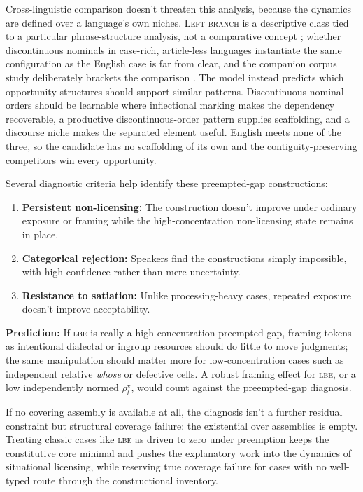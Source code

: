 \documentclass[12pt,letterpaper]{article}
\newcommand{\term}[1]{\textsc{#1}}
\newcommand{\mention}[1]{\textit{#1}}
\newcommand{\abbr}[1]{\textsc{#1}}
\begin{document}
Cross-linguistic comparison doesn't threaten this analysis, because the dynamics
are defined over a language's own niches. \term{Left branch} is a descriptive
class tied to a particular phrase-structure analysis, not a comparative concept
\autocite{haspelmath2010}; whether discontinuous nominals in case-rich,
article-less languages instantiate the same configuration as the English case is
far from clear, and the companion corpus study deliberately brackets the
comparison \autocite{reynolds2026lbe}. The model instead predicts which
opportunity structures should support similar patterns. Discontinuous nominal
orders should be learnable where inflectional marking makes the dependency
recoverable, a productive discontinuous-order pattern supplies scaffolding, and a
discourse niche makes the separated element useful. English meets none of the
three, so the candidate has no scaffolding of its own and the
contiguity-preserving competitors win every opportunity.

Several diagnostic criteria help identify these preempted-gap constructions:
\begin{enumerate}
\item \textbf{Persistent non-licensing:} The construction doesn't improve under ordinary exposure or framing while the high-concentration non-licensing state remains in place.
\item \textbf{Categorical rejection:} Speakers find the constructions simply impossible, with high confidence rather than mere uncertainty.
\item \textbf{Resistance to satiation:} Unlike processing-heavy cases, repeated exposure doesn't improve acceptability.
\end{enumerate}

\textbf{Prediction:} If \abbr{lbe} is really a high-concentration preempted gap, framing tokens as intentional dialectal or ingroup resources should do little to move judgments; the same manipulation should matter more for low-concentration cases such as independent relative \mention{whose} or defective cells. A robust framing effect for \abbr{lbe}, or a low independently normed $\rho_t^\star$, would count against the preempted-gap diagnosis.

If no covering assembly is available at all, the diagnosis isn't a further residual constraint but structural coverage failure: the existential over assemblies is empty. Treating classic cases like \abbr{lbe} as driven to zero under preemption keeps the constitutive core minimal and pushes the explanatory work into the dynamics of situational licensing, while reserving true coverage failure for cases with no well-typed route through the constructional inventory.
\end{document}
